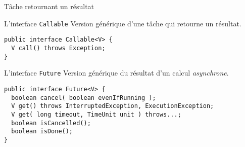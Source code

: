 
\begingroup

\begin{frame}[fragile]{Tâche retournant un résultat}

  \begin{block}{L'interface \lstinline{Callable}}
    Version générique d'une tâche qui retourne un résultat.

    \begin{lstlisting}[numbers=none]
public interface Callable<V> {
  V call() throws Exception;
}
    \end{lstlisting}
  \end{block}
  
  \bigskip

  \begin{block}{L'interface \lstinline{Future}}
    Version générique du résultat d'un calcul \textit{asynchrone}. 

    \begin{lstlisting}[numbers=none]
public interface Future<V> {
  boolean cancel( boolean evenIfRunning );
  V get() throws InterruptedException, ExecutionException;
  V get( long timeout, TimeUnit unit ) throws...;
  boolean isCancelled();
  boolean isDone();
}
    \end{lstlisting}
  \end{block}
\end{frame}

\endgroup
\endinput
